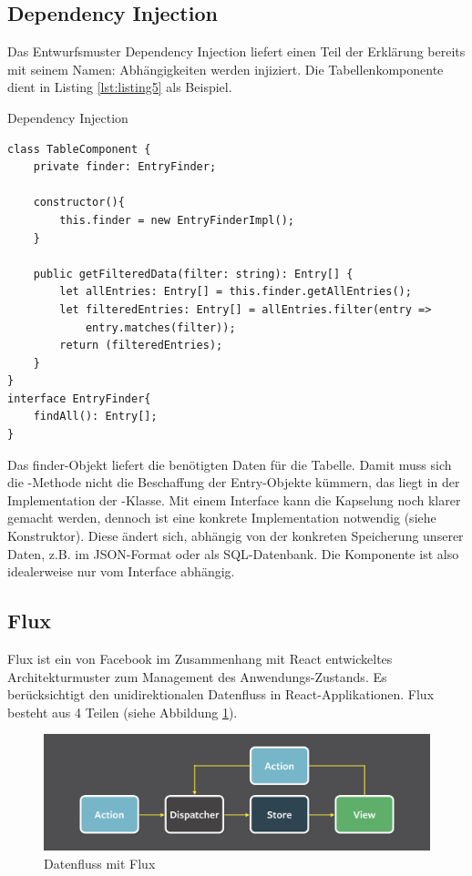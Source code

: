 \subsection{Dependency Injection}
Das Entwurfsmuster Dependency Injection liefert einen Teil der Erklärung bereits mit seinem Namen: Abhängigkeiten werden \glqq injiziert\grqq. Die Tabellenkomponente dient in Listing {\ref{lst:listing5}} als Beispiel.

\begin{listing}
\caption{Dependency Injection}
\label{lst:listing5}
\begin{verbatim}
class TableComponent {
    private finder: EntryFinder;

    constructor(){
        this.finder = new EntryFinderImpl();
    }

    public getFilteredData(filter: string): Entry[] {
        let allEntries: Entry[] = this.finder.getAllEntries();
        let filteredEntries: Entry[] = allEntries.filter(entry =>
            entry.matches(filter));
        return (filteredEntries);
    }
}
interface EntryFinder{
    findAll(): Entry[];
}
\end{verbatim}
\end{listing}

Das finder-Objekt liefert die benötigten Daten für die Tabelle. Damit muss sich die -Methode nicht die Beschaffung der Entry-Objekte kümmern, das liegt in der Implementation der -Klasse. Mit einem Interface kann die Kapselung noch klarer gemacht werden, dennoch ist eine konkrete Implementation notwendig (siehe Konstruktor). Diese ändert sich, abhängig von der konkreten Speicherung unserer Daten, z.B. im JSON-Format oder als SQL-Datenbank. Die Komponente ist also idealerweise nur vom Interface abhängig.

\subsection{Flux}
Flux ist ein von Facebook im Zusammenhang mit React entwickeltes Architekturmuster zum Management des Anwendungs-Zustands. Es berücksichtigt den unidirektionalen Datenfluss in React-Applikationen. Flux besteht aus 4 Teilen (siehe Abbildung \ref{fig:flux}).

\begin{figure}
  \centering
  \includegraphics[scale=0.32]{Grafiken/flux.png}
  \caption{Datenfluss mit Flux}
  \label{fig:flux}
\end{figure}

